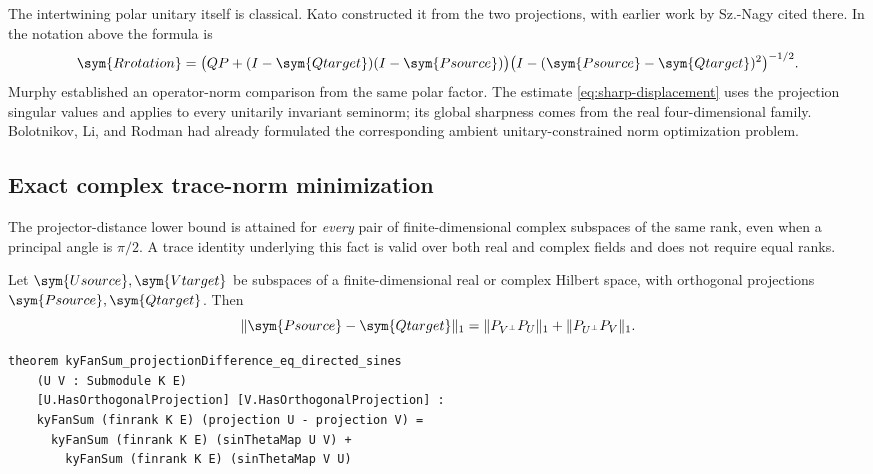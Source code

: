 The intertwining polar unitary itself is classical. Kato
\citep[Chapter~I, \S4.6, equations~(4.33)--(4.42)]{kato1966perturbation}
constructed it from the two projections, with earlier work by
Sz.-Nagy cited there. In the notation above the formula is
\[
 \sym{Rrotation}=\bigl(QP+(I-\sym{Qtarget})(I-\sym{Psource})\bigr)\bigl(I-(\sym{Psource}-\sym{Qtarget})^2\bigr)^{-1/2}.
\]
Murphy \citep[Lemma~6.2.1, p.~178]{murphy1990operator} established an
operator-norm comparison from the same polar factor. The estimate
\cref{eq:sharp-displacement} uses the projection singular values and
applies to every unitarily invariant seminorm; its global sharpness
comes from the real four-dimensional family. Bolotnikov, Li, and Rodman
\citep[Problem~1.1]{bolotnikov2001minimal} had already formulated the
corresponding ambient unitary-constrained norm optimization problem.

\subsection{Exact complex trace-norm minimization}
\label{sec:complex-trace-model}

The projector-distance lower bound is attained for \emph{every} pair of
finite-dimensional complex subspaces of the same rank, even when a principal
angle is $\pi/2$. A trace identity underlying this fact is valid over both
real and complex fields and does not require equal ranks.

\begin{proposition}
\label{prop:projection-trace-sine}
Let $\sym{Usource},\sym{Vtarget}$ be subspaces of a finite-dimensional real or complex
Hilbert space, with orthogonal projections $\sym{Psource},\sym{Qtarget}$. Then
\begin{equation}
 \|\sym{Psource}-\sym{Qtarget}\|_1
 =\|P_{V^\perp}P_U\|_1+\|P_{U^\perp}P_V\|_1.
 \label{eq:projection-directed-sines}
\end{equation}
\end{proposition}

\begin{lstlisting}[style=leanpaper,
 caption={Lean signature of the directed-sine trace identity, over real or
 complex finite-dimensional inner-product spaces. The surrounding
 scalar-field and ambient-space context is omitted.},
 label={lst:projection-trace-sine}]
theorem kyFanSum_projectionDifference_eq_directed_sines
    (U V : Submodule K E)
    [U.HasOrthogonalProjection] [V.HasOrthogonalProjection] :
    kyFanSum (finrank K E) (projection U - projection V) =
      kyFanSum (finrank K E) (sinThetaMap U V) +
        kyFanSum (finrank K E) (sinThetaMap V U)
\end{lstlisting}

